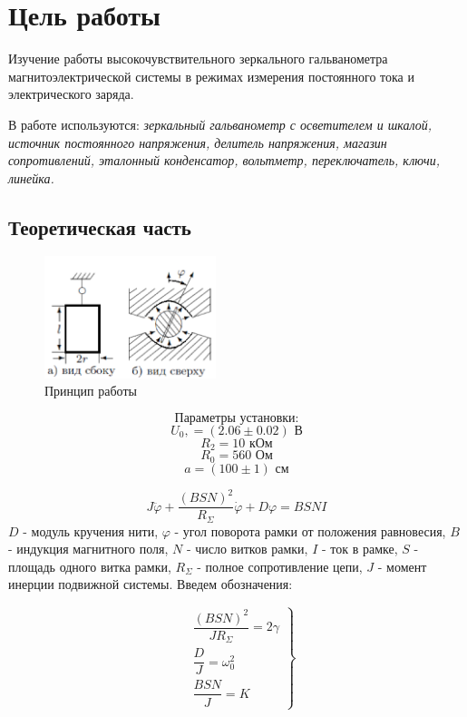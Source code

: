 \documentclass[a4paper, 12pt]{article}
\begin{document}
\section{Цель работы}
Изучение работы высокочувствительного зеркального гальванометра магнитоэлектрической системы в режимах измерения постоянного тока и электрического заряда.

В работе используются: \textit{зеркальный гальванометр с осветителем и шкалой, источник постоянного напряжения, делитель напряжения, магазин сопротивлений, эталонный конденсатор, вольтметр, переключатель, ключи, линейка.}


\subsection*{Теоретическая часть}

\begin{figure}
\includegraphics[width=5cm]{t}
\caption{Принцип работы}
\end{figure} 

		$$\text{Параметры установки:}$$
$$U_0,  = (2.06 \pm 0.02) \text{ В}$$
$$R_2 = 10 \text{ кОм}$$
$$R_0 = 560 \text{ Ом}$$
$$a = (100\pm 1) \text{ см}$$
\vspace{1 cm}

\begin{equation}
J \ddot{\varphi} + \dfrac{\left(BSN\right)^2}{R_{\Sigma}} \dot{\varphi} + D\varphi = BSNI
\end{equation}
$D$ - модуль кручения нити, $\varphi$ - угол поворота рамки от положения равновесия, $B$ - индукция магнитного поля, $N$ - число витков рамки, $I$ - ток в рамке, $S$ - площадь одного витка рамки, $R_{\Sigma}$ - полное сопротивление цепи, $J$ - момент инерции подвижной системы.
Введем обозначения:

\begin{equation}
\left.
\begin{aligned}
&\dfrac{(BSN)^2}{JR_{\Sigma}} = 2\gamma \\
&\dfrac{D}{J} = \omega_0^2 \\
&\dfrac{BSN}{J} = K 
\end{aligned}
\right\}
\end{equation}
\end{document}
